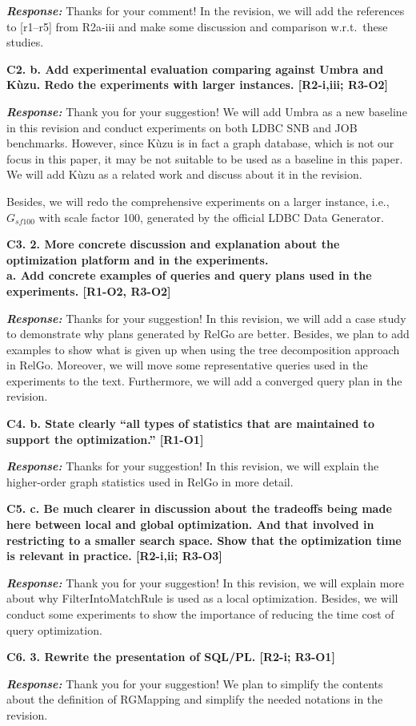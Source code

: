 \textbf{\textit{Response: }}
Thanks for your comment! In the revision, we will add the references to [r1--r5] from R2a-iii and make some discussion and comparison w.r.t.~these studies.


\textbf{C2. b. Add experimental evaluation comparing against Umbra and Kùzu. Redo the experiments with larger instances. [R2-i,iii; R3-O2]}

\textbf{\textit{Response: }}
Thank you for your suggestion! We will add Umbra as a new baseline in this revision and conduct experiments on both LDBC SNB and JOB benchmarks. 
However, since Kùzu is in fact a graph database, which is not our focus in this paper, it may be not suitable to be used as a baseline in this paper.
We will add Kùzu as a related work and discuss about it in the revision.

Besides, we will redo the comprehensive experiments on a larger instance, i.e., $G_{sf100}$ with scale factor 100, generated by the official LDBC Data Generator.


\textbf{
C3. 2. More concrete discussion and explanation about the optimization platform and in the experiments. \\
a. Add concrete examples of queries and query plans used in the experiments. [R1-O2, R3-O2]
}

\textbf{\textit{Response: }}
Thanks for your suggestion! In this revision, we will add a case study to demonstrate why plans generated by RelGo are better.
Besides, we plan to add examples to show what is given up when using the tree decomposition approach in RelGo.
Moreover, we will move some representative queries used in the experiments to the text.
Furthermore, we will add a converged query plan in the revision.

\textbf{
C4. b. State clearly “all types of statistics that are maintained to support the optimization.” [R1-O1]}

\textbf{\textit{Response: }}
Thanks for your suggestion! In this revision, we will explain the higher-order graph statistics used in RelGo in more detail.


\textbf{
C5. c. Be much clearer in discussion about the tradeoffs being made here between local and global optimization. And that involved in restricting to a smaller search space. Show that the optimization time is relevant in practice. [R2-i,ii; R3-O3]}

\textbf{\textit{Response: }}
Thank you for your suggestion! In this revision, we will explain more about why FilterIntoMatchRule is used as a local optimization. 
Besides, we will conduct some experiments to show the importance of reducing the time cost of query optimization.


\textbf{
C6. 3. Rewrite the presentation of SQL/PL. [R2-i; R3-O1]
}

\textbf{\textit{Response: }}
Thank you for your suggestion! We plan to simplify the contents about the definition of RGMapping and simplify the needed notations in the revision.

